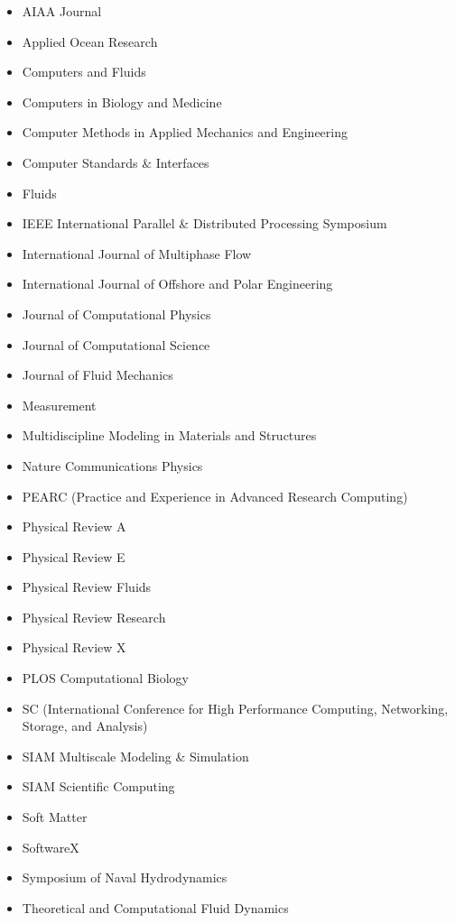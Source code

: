 \vspace{-0.5cm}
\begin{multicols}{2}
\begin{itemize}
    \item AIAA Journal
    \item Applied Ocean Research
    \item Computers and Fluids
    \item Computers in Biology and Medicine
    \item Computer Methods in Applied Mechanics and Engineering
    \item Computer Standards \& Interfaces 
    \item Fluids
    \item IEEE International Parallel \& Distributed Processing Symposium
    \item International Journal of Multiphase Flow
    \item International Journal of Offshore and Polar Engineering
    \item Journal of Computational Physics
    \item Journal of Computational Science
    \item Journal of Fluid Mechanics
    \item Measurement
    \item Multidiscipline Modeling in Materials and Structures
    \item Nature Communications Physics
    \item PEARC (Practice and Experience in Advanced Research Computing)
    \item Physical Review A
    \item Physical Review E
    \item Physical Review Fluids
    \item Physical Review Research
    \item Physical Review X
    \item PLOS Computational Biology
    \item SC (International Conference for High Performance Computing, Networking, Storage, and Analysis)
    \item SIAM Multiscale Modeling \& Simulation
    \item SIAM Scientific Computing
    \item Soft Matter
    \item SoftwareX
    \item Symposium of Naval Hydrodynamics
    \item Theoretical and Computational Fluid Dynamics
\end{itemize}
\end{multicols}

